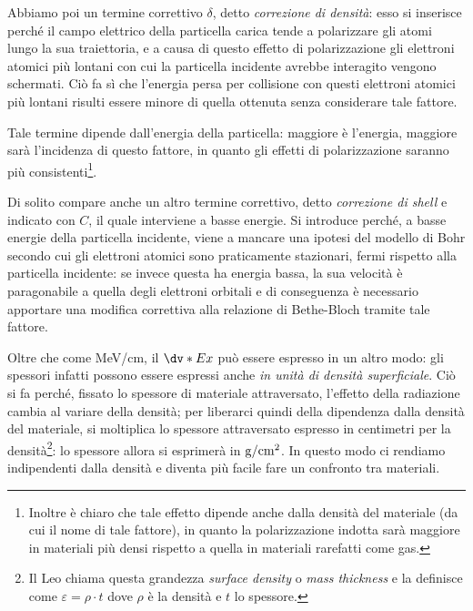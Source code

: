 Abbiamo poi un termine correttivo $\delta$, detto \textit{correzione di densità}: esso si inserisce perché il campo elettrico della particella carica tende a polarizzare gli atomi lungo la sua traiettoria, e a causa di questo effetto di polarizzazione gli elettroni atomici più lontani con cui la particella incidente avrebbe interagito vengono schermati. Ciò fa sì che l'energia persa per collisione con questi elettroni atomici più lontani risulti essere minore di quella ottenuta senza considerare tale fattore. 

Tale termine dipende dall'energia della particella: maggiore è l'energia, maggiore sarà l'incidenza di questo fattore, in quanto gli effetti di polarizzazione saranno più consistenti\footnote{Inoltre è chiaro che tale effetto dipende anche dalla densità del materiale (da cui il nome di tale fattore), in quanto la polarizzazione indotta sarà maggiore in materiali più densi rispetto a quella in materiali rarefatti come gas.}.

Di solito compare anche un altro termine correttivo, detto \textit{correzione di shell} e indicato con $C$, il quale interviene a basse energie. Si introduce perché, a basse energie della particella incidente, viene a mancare una ipotesi del modello di Bohr secondo cui gli elettroni atomici sono praticamente stazionari, fermi rispetto alla particella incidente: se invece questa ha energia bassa, la sua velocità è paragonabile a quella degli elettroni orbitali e di conseguenza è necessario apportare una modifica correttiva alla relazione di Bethe-Bloch tramite tale fattore.

\vspace{0.2cm}Oltre che come MeV/cm, il $\dv*{E}{x}$ può essere espresso in un altro modo: gli spessori infatti possono essere espressi anche \textit{in unità di densità superficiale}. Ciò si fa perché, fissato lo spessore di materiale attraversato, l'effetto della radiazione cambia al variare della densità; per liberarci quindi della dipendenza dalla densità del materiale, si moltiplica lo spessore attraversato espresso in centimetri per la densità\footnote{Il Leo chiama questa grandezza \textit{surface density} o \textit{mass thickness} e la definisce come $\varepsilon=\rho \cdot t$ dove $\rho$ è la densità e $t$ lo spessore.}: lo spessore allora si esprimerà in $\rm g/cm^2$. In questo modo ci rendiamo indipendenti dalla densità e diventa più facile fare un confronto tra materiali.

